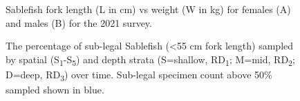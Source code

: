 \documentclass[12pt]{article}\usepackage[]{graphicx}\usepackage[]{color}
\begin{document}
\begin{figure}[htb]

{\centering {} 

}

\caption{Sablefish fork length (L in cm) vs weight (W in kg) for females (A) and males (B) for the 2021 survey.}\label{fig:figure14}
\end{figure}

\begin{figure}[htb]

{\centering {} 

}

\caption{The percentage of sub-legal Sablefish (\textless55 cm fork length) sampled by spatial (S\textsubscript{1}-S\textsubscript{5}) and depth strata (S=shallow, RD\textsubscript{1}; M=mid, RD\textsubscript{2}; D=deep, RD\textsubscript{3}) over time. Sub-legal specimen count above 50\% sampled shown in blue.}\label{fig:figure15}
\end{figure}
\clearpage
\end{document}
